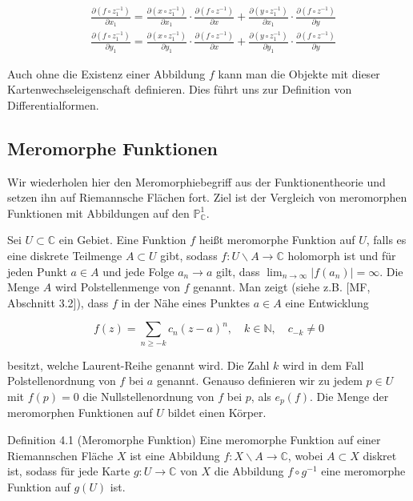 \documentclass[10pt, letterpaper]{article}
\begin{document}
$$
\begin{aligned}
& \frac{\partial\left(f \circ z_{1}^{-1}\right)}{\partial x_{1}}=\frac{\partial\left(x \circ z_{1}^{-1}\right)}{\partial x_{1}} \cdot \frac{\partial\left(f \circ z^{-1}\right)}{\partial x}+\frac{\partial\left(y \circ z_{1}^{-1}\right)}{\partial x_{1}} \cdot \frac{\partial\left(f \circ z^{-1}\right)}{\partial y} \\
& \frac{\partial\left(f \circ z_{1}^{-1}\right)}{\partial y_{1}}=\frac{\partial\left(x \circ z_{1}^{-1}\right)}{\partial y_{1}} \cdot \frac{\partial\left(f \circ z^{-1}\right)}{\partial x}+\frac{\partial\left(y \circ z_{1}^{-1}\right)}{\partial y_{1}} \cdot \frac{\partial\left(f \circ z^{-1}\right)}{\partial y}
\end{aligned}
$$

Auch ohne die Existenz einer Abbildung $f$ kann man die Objekte mit dieser Kartenwechseleigenschaft definieren. Dies führt uns zur Definition von Differentialformen.

\subsection {Meromorphe Funktionen}
Wir wiederholen hier den Meromorphiebegriff aus der Funktionentheorie und setzen ihn auf Riemannsche Flächen fort. Ziel ist der Vergleich von meromorphen Funktionen mit Abbildungen auf den $\mathbb{P}_{\mathbb{C}}^{1}$.

Sei $U \subset \mathbb{C}$ ein Gebiet. Eine Funktion $f$ heißt meromorphe Funktion auf $U$, falls es eine diskrete Teilmenge $A \subset U$ gibt, sodass $f: U \backslash A \rightarrow \mathbb{C}$ holomorph ist und für jeden Punkt $a \in A$ und jede Folge $a_{n} \rightarrow a$ gilt, dass $\lim _{n \rightarrow \infty}\left|f\left(a_{n}\right)\right|=\infty$. Die Menge $A$ wird Polstellenmenge von $f$ genannt. Man zeigt (siehe z.B. [MF, Abschnitt 3.2]), dass $f$ in der Nähe eines Punktes $a \in A$ eine Entwicklung

$$
f(z)=\sum_{n \geq-k} c_{n}(z-a)^{n}, \quad k \in \mathbb{N}, \quad c_{-k} \neq 0
$$

besitzt, welche Laurent-Reihe genannt wird. Die Zahl $k$ wird in dem Fall Polstellenordnung von $f$ bei $a$ genannt. Genauso definieren wir zu jedem $p \in U$ mit $f(p)=0$ die Nullstellenordnung von $f$ bei $p$, als $e_{p}(f)$. Die Menge der meromorphen Funktionen auf $U$ bildet einen Körper.

Definition 4.1 (Meromorphe Funktion) Eine meromorphe Funktion auf einer Riemannschen Fläche $X$ ist eine Abbildung $f: X \backslash A \rightarrow \mathbb{C}$, wobei $A \subset X$ diskret ist, sodass für jede Karte $g: U \rightarrow \mathbb{C}$ von $X$ die Abbildung $f \circ g^{-1}$ eine meromorphe Funktion auf $g(U)$ ist.
\end{document}
